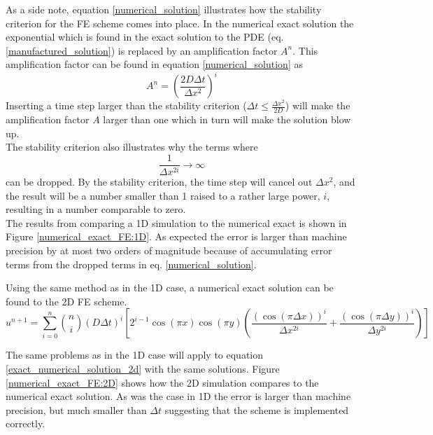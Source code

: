 As a side note, equation \eqref{numerical_solution} illustrates how the stability criterion for the FE scheme comes into place. 
In the numerical exact solution the exponential which is found in the exact solution to the PDE (eq. \ref{manufactured_solution}) is replaced by an amplification factor $A^n$.
This amplification factor can be found in equation \eqref{numerical_solution} as 
\begin{equation}
A^n = \left(\frac{2D\Delta t}{\Delta x^2}\right)^i
\end{equation}
Inserting a time step larger than the stability criterion ($\Delta t \leq \frac{\Delta x^2}{2D}$) will make the amplification factor $A$ larger than one which in turn will make the solution blow up. \\
The stability criterion also illustrates why the terms where 
$$ \frac{1}{\Delta x^{2i}} \to \infty$$
 can be dropped. 
 By the stability criterion, the time step will cancel out $\Delta x^2$, and the result will be a number smaller than 1 raised to a rather large power, $i$, resulting in a number comparable to zero.\\
 
 The results from comparing a 1D simulation to the numerical exact is shown in Figure \ref{numerical_exact_FE:1D}. 
 As expected the error is larger than machine precision by at most two orders of magnitude because of accumulating error terms from the dropped terms in eq. \eqref{numerical_solution}.
 
 Using the same method as in the 1D case, a numerical exact solution can be found to the 2D FE scheme. 
 \begin{equation}\label{exact_numerical_solution_2d}
 u^{n+1} = \sum\limits^n_{i=0}{n\choose i}\left(D\Delta t\right)^i\left[2^{i-1}\cos(\pi x)\cos(\pi y)\left(\frac{(\cos(\pi\Delta x))^i}{\Delta x^{2i}} +\frac{(\cos(\pi\Delta y))^i}{\Delta y^{2i}}\right)\right]
\end{equation}

The same problems as in the 1D case will apply to equation \eqref{exact_numerical_solution_2d} with the same solutions. 
Figure \ref{numerical_exact_FE:2D} shows how the 2D simulation compares to the numerical exact solution. 
As was the case in 1D the error is larger than machine precision, but much smaller than $\Delta t$ suggesting that the scheme is implemented correctly.

